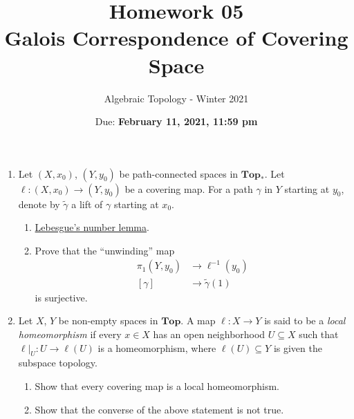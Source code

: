 \documentclass{article}
\title{Homework 05 \\ Galois Correspondence of Covering Space}
\author{Algebraic Topology - Winter 2021}
\date{Due: \textbf{February 11, 2021, 11:59 pm}}
\begin{document}
\maketitle

\begin{enumerate}
    \item 
    Let $(X,x_0)$, $(Y,y_0)$ be path-connected spaces in $\mathbf{Top}_*$.
    Let $\ell: (X,x_0) \to (Y,y_0)$ be a covering map. For a path $\gamma$ in $Y$ starting at $y_0$, denote by $\widetilde{\gamma}$ a lift of $\gamma$ starting at $x_0$.
    \begin{enumerate}
        \item
        \href{https://en.wikipedia.org/wiki/Lebesgue\%27s_number_lemma}{Lebesgue's number lemma}.
        \item Prove that the ``unwinding'' map 
        \begin{align*}
            \pi_1(Y,y_0) & \to \ell^{-1}(y_0) \\ 
            [\gamma] &\to \widetilde{\gamma}(1)
        \end{align*}
        is surjective.
    \end{enumerate}
    
    \item 
    Let $X$, $Y$ be non-empty spaces in $\mathbf{Top}$. A map $\ell: X \to Y$ is said to be a \emph{local homeomorphism} if every $x \in X$ has an open neighborhood $U \subseteq X$ such that $\ell |_U : U \to \ell(U)$ is a homeomorphism, where $\ell(U) \subseteq Y$ is given the subspace topology. 
    \begin{enumerate}
        \item Show that every covering map is a local homeomorphism.
        \item Show that the converse of the above statement is not true.
    \end{enumerate}
    

\end{enumerate}
\end{document}
